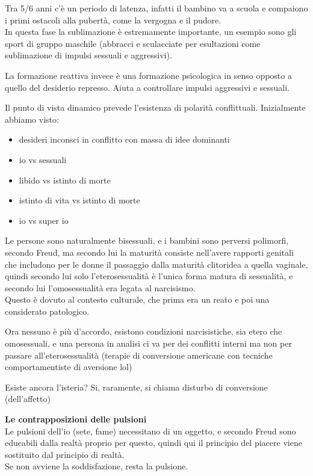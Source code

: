 \documentclass[
]{article}
\providecommand{\tightlist}{%
  \setlength{\itemsep}{0pt}\setlength{\parskip}{0pt}}
\begin{document}
Tra 5/6 anni c'è un periodo di latenza, infatti il bambino va a scuola e
compaiono i primi ostacoli alla pubertà, come la vergogna e il pudore.\\
In questa fase la sublimazione è estremamente importante, un esempio
sono gli sport di gruppo maschile (abbracci e sculacciate per
esultazioni come sublimazione di impulsi sessuali e aggressivi).

La formazione reattiva invece è una formazione psicologica in senso
opposto a quello del desiderio represso. Aiuta a controllare impulsi
aggressivi e sessuali.

Il punto di vista dinamico prevede l'esistenza di polarità conflittuali.
Inizialmente abbiamo visto:

\begin{itemize}
\tightlist
\item
  desideri inconsci in conflitto con massa di idee dominanti
\item
  io vs sessuali
\item
  libido vs istinto di morte
\item
  istinto di vita vs istinto di morte
\item
  io vs super io
\end{itemize}

Le persone sono naturalmente bisessuali, e i bambini sono perversi
polimorfi, secondo Freud, ma secondo lui la maturità consiste nell'avere
rapporti genitali che includono per le donne il passaggio dalla maturità
clitoridea a quella vaginale, quindi secondo lui solo l'eterosessualità
è l'unica forma matura di sessualità, e secondo lui l'omosessualità era
legata al narcisismo.\\
Questo è dovuto al contesto culturale, che prima era un reato e poi una
considerato patologico.

Ora nessuno è più d'accordo, esistono condizioni narcisistiche, sia
etero che omosessuali, e una persona in analisi ci va per dei conflitti
interni ma non per passare all'eterosessualità (terapie di conversione
americane con tecniche comportamentiste di aversione lol)

Esiste ancora l'isteria? Si, raramente, si chiama disturbo di
conversione (dell'affetto)

\textbf{Le contrapposizioni delle pulsioni}\\
Le pulsioni dell'io (sete, fame) necessitano di un oggetto, e secondo
Freud sono educabili dalla realtà proprio per questo, quindi qui il
principio del piacere viene sostituito dal principio di realtà.\\
Se non avviene la soddisfazione, resta la pulsione.
\end{document}
